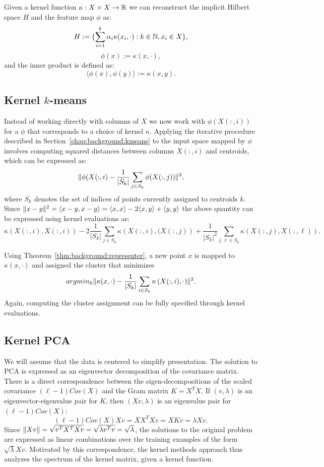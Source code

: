\begin{theorem}\label{thm:background:representer}
Given a kernel function $\kappa: X \times X \rightarrow \mathbb{R}$ we can reconstruct the implicit Hilbert space $H$ and the feature map $\phi$ as:
$$ H := \{ \sum_{i=1}^k \alpha_i \kappa(x_i, \cdot): k \in \mathbb{N}, x_i \in X \},$$
$$ \phi(x) := \kappa(x, \cdot), $$ and the inner product is defined as:
$$ \langle \phi(x), \phi(y) \rangle := \kappa(x,y).$$
\end{theorem}

\subsection{Kernel $k$-means}

Instead of working directly with columns of $X$ we now work with $\phi\left(X(:,i)\right)$ for a $\phi$ that corresponds to a choice of kernel $\kappa$.
Applying the iterative procedure described in Section~\ref{chap:background:kmeans} to the input space mapped by $\phi$ involves computing squared distances between columns $X(:,i)$ and centroids, which can be expressed as:
$$ \lVert \phi(X(:,i) - \frac{1}{|S_k|} \sum_{j \in S_k} \phi(X(:,j)) \rVert^2,$$
where $S_k$ denotes the set of indices of points currently assigned to centroids $k$.
Since $\lVert x - y\rVert^2 = \langle x-y, x-y \rangle = \langle x,x \rangle - 2 \langle x, y \rangle + \langle y, y \rangle$
the above quantity can be expressed using kernel evaluations as:
$$ \kappa\left(X(:,i),X(:,i)\right) - 2 \frac{1}{|S_k|} \sum_{j \in S_k} \kappa\left(X(:,i), (X(:,j) \right) + \frac{1}{|S_k|^2} \sum_{j,\ell \in S_k} \kappa\left( X(:,j), X(:,\ell) \right).$$

Using Theorem~\ref{thm:background:representer}, a new point $x$ is mapped to $\kappa(x, \cdot)$ and assigned the cluster that
minimizes
$$ argmin_k \lVert \kappa(x,\cdot) - \frac{1}{|S_k|} \sum_{i \in S_k} \kappa\left(X(:,i), \cdot\right)\rVert^2.$$
Again, computing the cluster assignment can be fully specified through kernel evaluations.

\subsection{Kernel PCA}

We will assume that the data is centered to simplify presentation.
The solution to PCA is expressed as an eigenvector decomposition of the covariance matrix. There is a direct correspondence between
the eigen-decompositions of the scaled covariance $(\ell - 1) Cov(X)$ and the Gram matrix $K = X^T X$.
If $(v, \lambda)$ is an eigenvector-eigenvalue pair for $K$, then $(X v, \lambda)$ is an eigenvalue pair for $(\ell - 1) Cov(X)$:
$$ (\ell - 1) Cov(X) X v = X X^T X v = X K v = \lambda X v.$$
Since $\lVert X v\rVert = \sqrt{v^T X^T X v} = \sqrt{ \lambda v^T v } = \sqrt{\lambda}$,
the solutions to the original problem are expressed as linear combinations over the training examples of the form $\sqrt{\lambda}X v$.
Motivated by this correspondence, the kernel methods approach thus analyzes the spectrum of the kernel matrix, given a kernel function.


